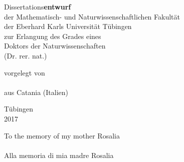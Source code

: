 \begin{titlepage}
\makeatletter %
\setlength{\parskip}{0pt}
\centering
\large
%
\linespread{1.5}\selectfont
\sffamily
\slshape
\selectfont

\vspace*{-2cm}

{\huge \bfseries
  \@title%
  \par%
}

\vspace{4cm}

{Dissertations\/\bfseries\upshape entwurf}\\
der Mathematisch- und Naturwissenschaftlichen Fakult\"at\\
der Eberhard Karls Universit\"at T\"ubingen\\
zur Erlangung des Grades eines\\
Doktors der Naturwissenschaften\\
(Dr. rer. nat.)

\vspace{4 cm}

vorgelegt von \\
\@author \\
aus Catania (Italien)

\vspace{2 cm}

T\"ubingen\\
2017

\vfill
\end{titlepage}
\clearpage
\cleardoublepage
{%
\begin{flushright}
  \null{}
  To the memory of my mother Rosalia\\
  ~\\
  Alla memoria di mia madre Rosalia

  \null
\end{flushright}}
